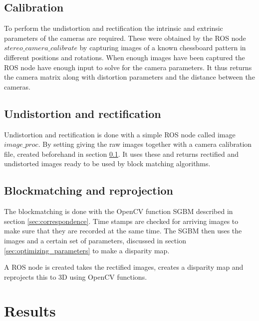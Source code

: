 \subsection{Calibration} \label{sec:calibration}

To perform the undistortion and rectification the intrinsic and extrinsic parameters of the cameras are required. These were obtained by the ROS node $stereo\_camera\_calibrate$ by capturing images of a known chessboard pattern in different positions and rotations. When enough images have been captured the ROS node have enough input to solve for the camera parameters. It thus returns the camera matrix along with distortion parameters and the distance between the cameras.


\subsection{Undistortion and rectification}

Undistortion and rectification is done with a simple ROS node called image $image\_proc$. By setting giving the raw images together with a camera calibration file, created beforehand in section \ref{sec:calibration}. It uses these and returns rectified and undistorted images ready to be used by block matching algorithms.

\subsection{Blockmatching and reprojection}

The blockmatching is done with the OpenCV function SGBM described in section \ref{sec:correspondence}. Time stamps are checked for arriving images to make sure that they are recorded at the same time. The SGBM then uses the images and a certain set of parameters, discussed in section \ref{sec:optimizing_parameters} to make a disparity map. 


A ROS node is created takes the rectified images, creates a disparity map and reprojects this to 3D using OpenCV functions.

\section{Results}

